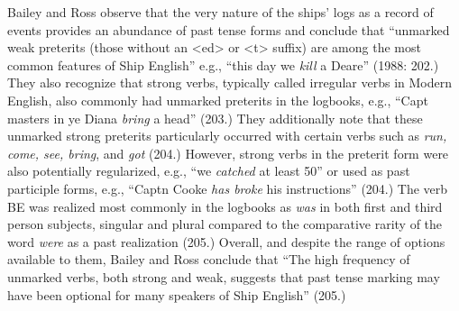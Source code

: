 Bailey and Ross observe that the very nature of the ships’ logs as a record of events provides an abundance of past tense forms and conclude that “unmarked weak preterits (those without an <ed> or <t> suffix) are among the most common features of Ship English” e.g., “this day we \textit{kill} a Deare” (1988: 202.) They also recognize that strong verbs, typically called irregular verbs in Modern English, also commonly had unmarked preterits in the logbooks, e.g., “Capt masters in ye Diana \textit{bring} a head” (203.) They additionally note that these unmarked strong preterits particularly occurred with certain verbs such as \textit{run, come, see, bring}, and \textit{got} (204.) However, strong verbs in the preterit form were also potentially regularized, e.g., “we \textit{catched} at least 50”  or used as past participle forms, e.g., “Captn Cooke \textit{has broke} his instructions” (204.) The verb BE was realized most commonly in the logbooks as \textit{was} in both first and third person subjects, singular and plural compared to the comparative rarity of the word \textit{were} as a past realization (205.) Overall, and despite the range of options available to them, Bailey and Ross conclude that “The high frequency of unmarked verbs, both strong and weak, suggests that past tense marking may have been optional for many speakers of Ship English” (205.) 

